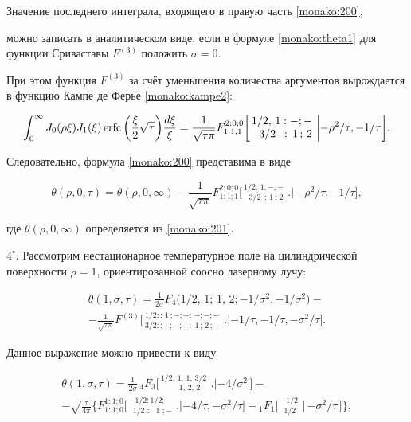 Значение последнего интеграла, входящего в правую часть \eqref{monako:200}, %

можно записать в аналитическом виде, если в формуле \eqref{monako:theta1} для функции Сриваставы $ F^{(3)} $ положить $ \sigma=0 $. 

При этом функция $ F^{(3)} $ за счёт уменьшения количества аргументов вырождается в функцию Кампе де Ферье \eqref{monako:kampe2}:

$$ \int _0^\infty J_0(\rho\xi) J_1(\xi)\mathop{\rm erfc}\bigg(\frac{\xi}{2}\sqrt{\tau}\bigg)\frac{d\xi}{\xi}=\frac{1}{\sqrt{\tau\pi}}F_{1:1;1}^{2:0;0}\bigg[\,^{\displaystyle 1 / 2,\,1:-;-}_{\displaystyle \,\,\,\,3 / 2\,\,\,:\,1\,;\,2}\,\,\bigg.\bigg| {-\rho^2}/{\tau}, {-1}/{\tau}\bigg].$$

Следовательно, формула \eqref{monako:200} представима в виде

\begin{equation}

\label{monako:202}

\theta(\rho, 0, \tau)=\theta (\rho,0,\infty)-\frac{1}{\sqrt{\tau\pi}}F_{1:1;1}^{2:0;0}\bigg[\,^{\displaystyle 1 / 2,\,1:-;-}_{\displaystyle \,\,\,\,3 / 2\,\,\,:\,1\,;\,2}\,\,\bigg.\bigg|\,{-\rho^2}/{\tau}, {-1}/{\tau}\bigg],

\end{equation}

где $ \theta (\rho,0,\infty) $ определяется из \eqref{monako:201}.



$4^\circ$. Рассмотрим нестационарное температурное поле на цилиндрической поверхности $ \rho=1 $, ориентированной соосно лазерному лучу:

\begin{multline*}

 \theta (1,\sigma,\tau)=\frac{1}{2\sigma}F_4\big(1 / 2,\,1;\,1,\,2; {-1}/{\sigma^2},{-1}/{\sigma^2}\big)- \\

- \frac{1}{\sqrt{\tau \pi}} F^{(3)}\bigg[\,^{\displaystyle 1 / 2::\,1\,;-;-:\,-;-;-}_{\displaystyle 3 / 2::-;-;-:\,\,1\,;\,2\,;-}\,\,\bigg.\bigg| {-1}/{\tau}, {-1}/{\tau}, {-\sigma^2/}{\tau}\bigg].

\end{multline*}

Данное выражение можно привести к виду

\begin{multline}

\theta (1,\sigma,\tau)=\frac{1}{2\sigma}\,_{4}F_{3}\bigg[\,^{\displaystyle 1 / 2,\,1,\,1,\,3 / 2}_{\displaystyle \quad \quad \,\,1,\,2,\,2}\,\,\bigg.\bigg| {-4}/{\sigma^2}\,\bigg]-\\

\label{monako:20}

- \sqrt{\frac{\tau}{4\pi}}\Bigg\{F_{1:1;0}^{1:1;0}\bigg[\,^{\displaystyle -1 / 2:1 / 2;-}_{\displaystyle \,\,\, 1 / 2 \,\,:\,\,\,\,1\,\,;-}\,\,\bigg.\bigg| {-4}/{\tau}, {-\sigma^2}/{\tau}\bigg]- {}_{1}F_{1}\bigg[\,^{\displaystyle -1 / 2}_{\displaystyle \,\,\,1 / 2}\,\,\bigg|\, {-\sigma^2}/ {\tau}\,\bigg]   \Bigg\},

\end{multline}

